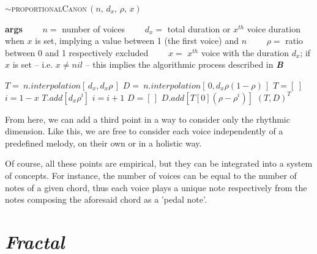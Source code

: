 \begin{algorithm}[H]
\caption{$\sim$\textsc{proportionalCanon}$\,(n,\, d_x,\, \rho,\, x)$}\label{ldwd}
\begin{algorithmic}%
\State \textbf{args}
\State $\qquad n =$ number of voices
\State $\qquad d_x =$ total duration or $x^{th}$ voice duration when $x$ is set, implying a value between 1 (the first voice) and $n$
\State $\qquad \rho =$ ratio between 0 and 1 respectively excluded
\State $\qquad x =$  $x^{th}$ voice with the duration $d_x$; if $x$ is set -- i.e. $x \neq nil$ -- this implies the algorithmic process described in \textbf{\textit{B}}
\State

\State $T =\:  n.interpolation[\,d_x, d_x \rho \,]$
\State $D = \: n.interpolation[\,0,  d_x \rho (1 -  \rho )\,]$
\State
\Else
{}
\State $T=[\:]$
\State $i =1-x$
\State $T.add\left [d_x \rho ^i\right ]$
\State $i=i+1$
\EndWhile
\State $D=[\,]$
\State $D.add\left [ T[0] (\rho-\rho^i)  \right ]$
\EndFor
\EndIf
\State
\State
\Return $(T,D)^T$
\end{algorithmic}
\end{algorithm}

From here, we can add a third point in a way to consider only the rhythmic dimension. Like this, we are free to consider each voice independently of a predefined melody, on their own or in a holistic way.

\bigskip 

Of course, all these points are empirical, but they can be integrated into a system of concepts.
For instance, the number of voices can be equal to the number of notes of a given chord, thus each voice plays a unique note respectively from the notes composing the aforesaid chord as a 'pedal note'.

\newpage
\section{\textsl{Fractal}}


